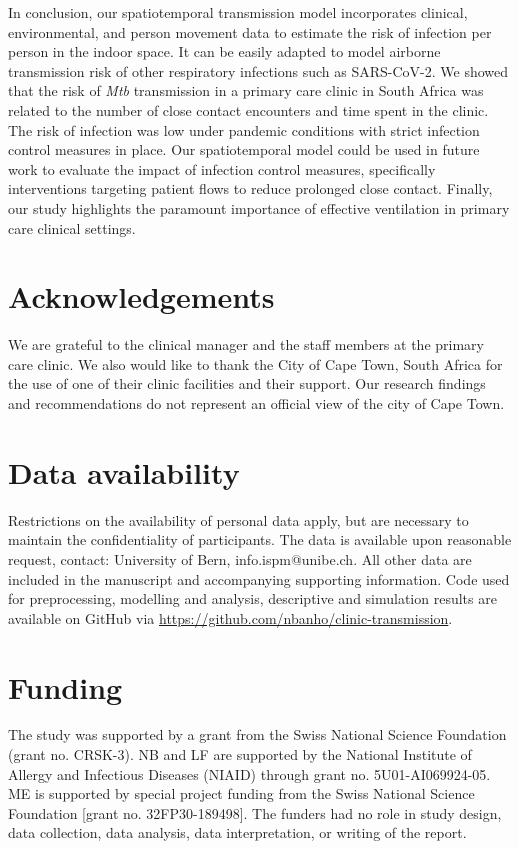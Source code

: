 \documentclass[fleqn,11pt]{wlscirep}
\begin{document}
In conclusion, our spatiotemporal transmission model incorporates clinical, environmental, and person movement data to estimate the risk of infection per person in the indoor space. It can be easily adapted to model airborne transmission risk of other respiratory infections such as SARS-CoV-2. We showed that the risk of \emph{Mtb} transmission in a primary care clinic in South Africa was related to the number of close contact encounters and time spent in the clinic. The risk of infection was low under pandemic conditions with strict infection control measures in place. Our spatiotemporal model could be used in future work to evaluate the impact of infection control measures, specifically interventions targeting patient flows to reduce prolonged close contact. Finally, our study highlights the paramount importance of effective ventilation in primary care clinical settings. 


\newpage


\section*{Acknowledgements}
We are grateful to the clinical manager and the staff members at the primary care clinic. We also would like to thank the City of Cape Town, South Africa for the use of one of their clinic facilities and their support. Our research findings and recommendations do not represent an official view of the city of Cape Town. 

\section*{Data availability}
Restrictions on the availability of personal data apply, but are necessary to maintain the confidentiality of participants. The data is available upon reasonable request, contact: University of Bern, info.ispm@unibe.ch. All other data are included in the manuscript and accompanying supporting information. Code used for preprocessing, modelling and analysis, descriptive and simulation results are available on GitHub via \url{https://github.com/nbanho/clinic-transmission}.

\section*{Funding}
The study was supported by a grant from the Swiss National Science Foundation (grant no. CRSK-3).  NB and LF are supported by the National Institute of Allergy and Infectious Diseases (NIAID) through grant no. 5U01-AI069924-05. ME is supported by special project funding from the Swiss National Science Foundation [grant no. 32FP30-189498]. The funders had no role in study design, data collection, data analysis, data interpretation, or writing of the report.
\end{document}

